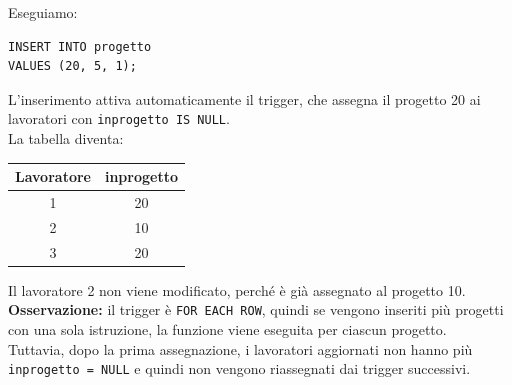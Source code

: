 \noindent
Eseguiamo:
\begin{verbatim}
INSERT INTO progetto
VALUES (20, 5, 1);
\end{verbatim}
\noindent
L'inserimento attiva automaticamente il trigger,
che assegna il progetto 20 ai lavoratori
con \texttt{inprogetto IS NULL}.\\
La tabella diventa:
\begin{center}
\begin{tabular}{|c|c|}
\hline
Lavoratore & inprogetto \\
\hline
1 & 20 \\
2 & 10 \\
3 & 20 \\
\hline
\end{tabular}
\end{center}
\noindent
Il lavoratore 2 non viene modificato,
perché è già assegnato al progetto 10.\\
\textbf{Osservazione:} il trigger è
\texttt{FOR EACH ROW}, quindi se vengono inseriti
più progetti con una sola istruzione,
la funzione viene eseguita per ciascun progetto.\\
Tuttavia, dopo la prima assegnazione,
i lavoratori aggiornati non hanno più
\texttt{inprogetto = NULL} e quindi
non vengono riassegnati dai trigger successivi.
